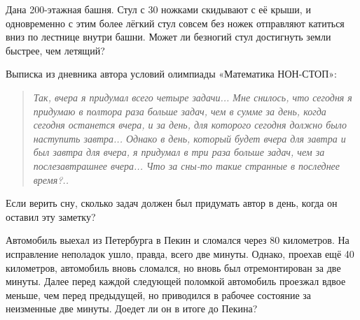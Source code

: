 ﻿

\begin{itemize}
\itA Дана 200-этажная башня. Стул с 30 ножками скидывают с её крыши, и одновременно с этим более лёгкий стул совсем без ножек отправляют катиться вниз по лестнице внутри башни. Может ли безногий стул достигнуть земли быстрее, чем летящий?

\itB Выписка из дневника автора условий олимпиады «Математика НОН-СТОП»:

\begin{quote}
\it
Так, вчера я придумал всего четыре задачи... Мне снилось, что сегодня я придумаю в полтора раза больше задач, чем в сумме за день, когда сегодня останется вчера, и за день, для которого сегодня должно было наступить завтра... Однако в день, который будет вчера для завтра и был завтра для вчера, я придумал в три раза больше задач, чем за послезавтрашнее вчера... Что за сны-то такие странные в последнее время?..
\end{quote}

\noindent Если верить сну, сколько задач должен был придумать автор в день, когда он оставил эту заметку?

\itC Автомобиль выехал из Петербурга в Пекин и сломался через 80 километров. На исправление неполадок ушло, правда, всего две минуты. Однако, проехав ещё 40 километров, автомобиль вновь сломался, но вновь был отремонтирован за две минуты. Далее перед каждой следующей поломкой автомобиль проезжал вдвое меньше, чем перед предыдущей, но приводился в рабочее состояние за неизменные две минуты. Доедет ли он в итоге до Пекина?
\end{itemize}